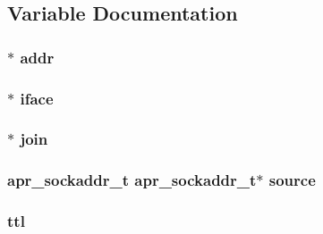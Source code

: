 \subsection{Variable Documentation}
\subsubsection[{\texorpdfstring{addr}{addr}}]{$\ast$ addr}\hypertarget{group__apr__mcast_gaf32a3eae6659774e82d8fc61ebc0169d}{}\label{group__apr__mcast_gaf32a3eae6659774e82d8fc61ebc0169d}
\subsubsection[{\texorpdfstring{iface}{iface}}]{ $\ast$ iface}\hypertarget{group__apr__mcast_ga723508cfed79f6d0c8b49717f7e56178}{}\label{group__apr__mcast_ga723508cfed79f6d0c8b49717f7e56178}
\subsubsection[{\texorpdfstring{join}{join}}]{$\ast$ join}\hypertarget{group__apr__mcast_ga2d95afe63c78661afb200a75da9ae794}{}\label{group__apr__mcast_ga2d95afe63c78661afb200a75da9ae794}
\subsubsection[{\texorpdfstring{source}{source}}]{ {\bf apr\+\_\+sockaddr\+\_\+t} {\bf apr\+\_\+sockaddr\+\_\+t}$\ast$ source}\hypertarget{group__apr__mcast_ga9b1b80407da58f6c0654348c017710eb}{}\label{group__apr__mcast_ga9b1b80407da58f6c0654348c017710eb}
\subsubsection[{\texorpdfstring{ttl}{ttl}}]{ ttl}\hypertarget{group__apr__mcast_gaecc55bc3d317d868b03f6b7136d66f36}{}\label{group__apr__mcast_gaecc55bc3d317d868b03f6b7136d66f36}

